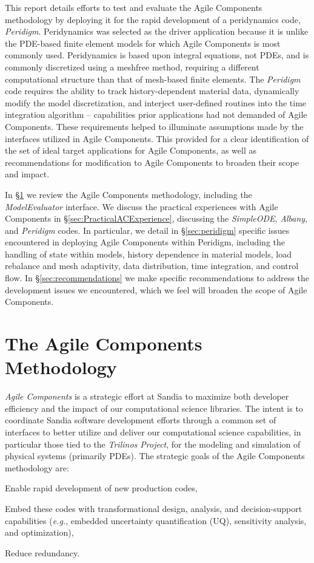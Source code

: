 \documentclass[pdf,ps2pdf,12pt,report]{SANDreport}
\theoremstyle{plain}
\theoremstyle{definition}
\theoremstyle{remark}
\numberwithin{equation}{section}
\newenvironment{packed_itemize}{
\begin{itemize}
  \setlength{\itemsep}{1pt}
  \setlength{\parskip}{0pt}
  \setlength{\parsep}{0pt}
}{\end{itemize}}
\begin{document}
This report details efforts to test and evaluate the Agile Components methodology by deploying it for the rapid development of a peridynamics code, \emph{Peridigm}. Peridynamics was selected as the driver application because it is unlike the PDE-based finite element models for which Agile Components is most commonly used. Peridynamics is based upon integral equations, not PDEs, and is commonly discretized using a meshfree method, requiring a different computational structure than that of mesh-based finite elements. The \emph{Peridigm} code requires the ability to track history-dependent material data, dynamically modify the model discretization, and interject user-defined routines into the time integration algorithm -- capabilities prior applications had not demanded of Agile Components. These requirements helped to illuminate assumptions made by the interfaces utilized in Agile Components. This provided for a clear identification of the set of ideal target applications for Agile Components, as well as recommendations for modification to Agile Components to broaden their scope and impact.

In \S\ref{sec:ACMeth} we review the Agile Components methodology, including the \emph{ModelEvaluator} interface. We discuss the practical experiences with Agile Components in \S\ref{sec:PracticalACExperience}, discussing the \emph{SimpleODE}, \emph{Albany}, and \emph{Peridigm} codes. In particular, we detail in \S\ref{sec:peridigm} specific issues encountered in deploying Agile Components within Peridigm, including the handling of state within models, history dependence in material models, load rebalance and mesh adaptivity, data distribution, time integration, and control flow. In \S\ref{sec:recommendations} we make specific recommendations to address the development issues we encountered, which we feel will broaden the scope of Agile Components.

\section{The Agile Components Methodology} \label{sec:ACMeth}

\emph{Agile Components} is a strategic effort at Sandia to maximize both developer efficiency and the impact of our computational science libraries. The intent is to coordinate Sandia software development efforts through a common set of interfaces to better utilize and deliver our computational science capabilities, in particular those tied to the \emph{Trilinos Project}, for the modeling and simulation of physical systems (primarily PDEs). The strategic goals of the Agile Components methodology are:
\begin{packed_itemize}
  \item Enable rapid development of new production codes,
  \item Embed these codes with transformational design, analysis, and decision-support capabilities ({\it e.g.}, embedded uncertainty quantification (UQ), sensitivity analysis, and optimization),
  \item Reduce redundancy.
\end{packed_itemize}
\end{document}
